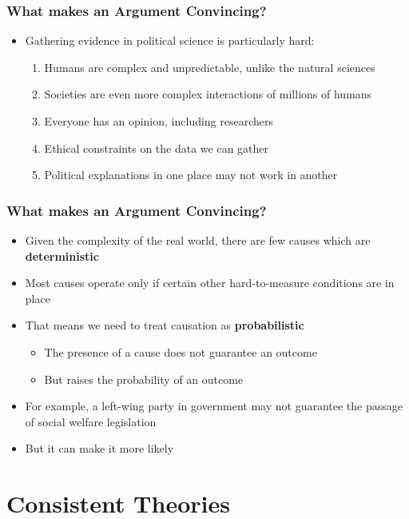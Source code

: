 \documentclass[xcolor=x11names,compress]{beamer}\usepackage[]{graphicx}\usepackage[]{color}
\renewcommand{\(}{\begin{columns}}
\renewcommand{\)}{\end{columns}}
\newcommand{\<}[1]{\begin{column}{#1}}
\renewcommand{\>}{\end{column}}
\begin{document}
\begin{frame}
\frametitle{What makes an Argument Convincing?}
\begin{itemize}
\item Gathering evidence in political science is particularly hard:
\pause
\begin{enumerate}
\item Humans are complex and unpredictable, unlike the natural sciences
\pause
\item Societies are even more complex interactions of millions of humans
\pause
\item Everyone has an opinion, including researchers
\pause
\item Ethical constraints on the data we can gather
\pause
\item Political explanations in one place may not work in another
\end{enumerate}
\end{itemize}
\end{frame}

\begin{frame}
\frametitle{What makes an Argument Convincing?}
\begin{itemize}
\item Given the complexity of the real world, there are few causes which are \textbf{deterministic}
\pause
\item Most causes operate only if certain other hard-to-measure conditions are in place
\pause
\item That means we need to treat causation as \textbf{probabilistic}
\pause
\begin{itemize}
\item The presence of a cause does not guarantee an outcome
\item But raises the probability of an outcome
\pause
\end{itemize}
\item For example, a left-wing party in government may not guarantee the passage of social welfare legislation
\item But it can make it more likely
\end{itemize}
\end{frame}

\section{Consistent Theories}
\end{document}
